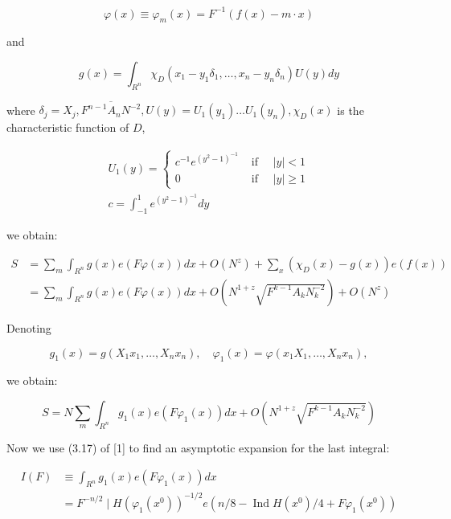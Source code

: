 \documentclass[10pt]{article}
\begin{document}
$$
\varphi(x) \equiv \varphi_{m}(x)=F^{-1}(f(x)-m \cdot x)
$$

and

$$
g(x)=\int_{R^{n}} \chi_{D}\left(x_{1}-y_{1} \delta_{1}, \ldots, x_{n}-y_{n} \delta_{n}\right) U(y) d y
$$

where $\delta_{j}=X_{j}, \overline{F^{n-1} A_{n} N^{-2}}, U(y)=U_{1}\left(y_{1}\right) \ldots U_{1}\left(y_{n}\right), \chi_{D}(x)$ is the characteristic function of $D$,

$$
\begin{gathered}
U_{1}(y)= \begin{cases}c^{-1} e^{\left(y^{2}-1\right)^{-1}} & \text { if } \quad|y|<1 \\
0 & \text { if } \quad|y| \geqslant 1\end{cases} \\
c=\int_{-1}^{1} e^{\left(y^{2}-1\right)^{-1}} d y
\end{gathered}
$$

we obtain:

$$
\begin{aligned}
S & =\sum_{m} \int_{R^{n}} g(x) e(F \varphi(x)) d x+O\left(N^{z}\right)+\sum_{x}\left(\chi_{D}(x)-g(x)\right) e(f(x)) \\
& =\sum_{m} \int_{R^{n}} g(x) e(F \varphi(x)) d x+O\left(N^{1+z} \sqrt{F^{k-1} A_{k} N_{k}^{-2}}\right)+O\left(N^{z}\right)
\end{aligned}
$$

Denoting

$$
g_{1}(x)=g\left(X_{1} x_{1}, \ldots, X_{n} x_{n}\right), \quad \varphi_{1}(x)=\varphi\left(x_{1} X_{1}, \ldots, X_{n} x_{n}\right),
$$

we obtain:


\begin{equation*}
S=N \sum_{m} \int_{R^{n}} g_{1}(x) e\left(F \varphi_{1}(x)\right) d x+O\left(N^{1+z} \sqrt{F^{k-1} A_{k} N_{k}^{-2}}\right) \tag{6}
\end{equation*}


Now we use (3.17) of [1] to find an asymptotic expansion for the last integral:

$$
\begin{aligned}
I(F) & \equiv \int_{R^{n}} g_{1}(x) e\left(F \varphi_{1}(x)\right) d x \\
& =F^{-n / 2} \mid H\left(\varphi_{1}\left(x^{0}\right)\right)^{-1 / 2} e\left(n / 8-\operatorname{Ind} H\left(x^{0}\right) / 4+F \varphi_{1}\left(x^{0}\right)\right)
\end{aligned}
$$
\end{document}
